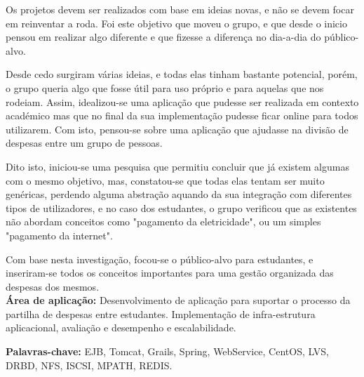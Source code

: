 \begin{resumo}

Os projetos devem ser realizados com base em ideias novas, e não se devem focar em reinventar a roda. Foi este objetivo que moveu o grupo, e que desde o inicio pensou em realizar algo diferente e que fizesse a diferença no dia-a-dia do público-alvo.

Desde cedo surgiram várias ideias, e todas elas tinham bastante potencial, porém, o grupo queria algo que fosse útil para uso próprio e para aquelas que nos rodeiam. Assim, idealizou-se uma aplicação que pudesse ser realizada em contexto académico mas que no final da sua implementação pudesse ficar online para todos utilizarem. Com isto, pensou-se sobre uma aplicação que ajudasse na divisão de despesas entre um grupo de pessoas.

Dito isto, iniciou-se uma pesquisa que permitiu concluir que já existem algumas com o mesmo objetivo, mas, constatou-se que todas elas tentam ser muito genéricas, perdendo alguma abstração aquando da sua integração com diferentes tipos de utilizadores, e no caso dos estudantes, o grupo verificou que as existentes não abordam conceitos como "pagamento da eletricidade", ou um simples "pagamento da internet".

Com base nesta investigação, focou-se o público-alvo para estudantes, e inseriram-se todos os conceitos importantes para uma gestão organizada das despesas dos mesmos. \\

\textbf{Área de aplicação:} Desenvolvimento de aplicação para suportar o processo da partilha de despesas entre estudantes. Implementação de infra-estrutura aplicacional, avaliação e desempenho e escalabilidade.

\textbf{Palavras-chave:} EJB, Tomcat, Grails, Spring, WebService, CentOS, LVS, DRBD, NFS, ISCSI, MPATH, REDIS.

\end{resumo}